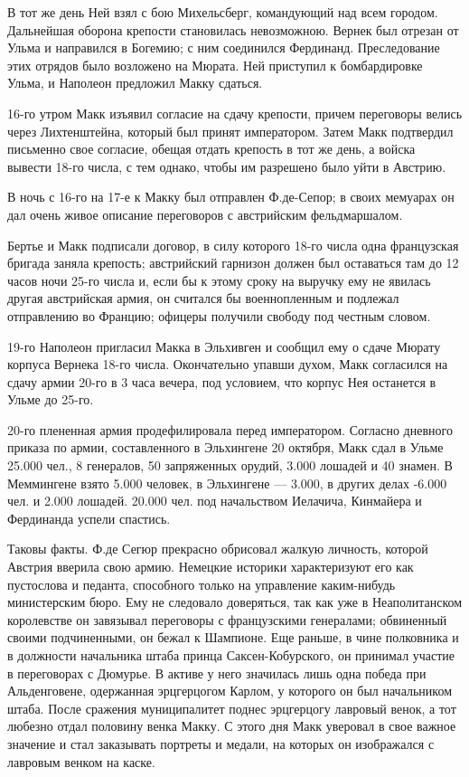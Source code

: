 \documentclass[
  oneside,
  12pt,
  titlepage]{book}
\begin{document}
В тот же день Ней взял с бою Михельсберг, командующий над всем городом. Дальнейшая оборона крепости становилась невозможною. Вернек был отрезан от Ульма и направился в Богемию; с ним соединился Фердинанд. Преследование этих отрядов было возложено на Мюрата. Ней приступил к бомбардировке Ульма, и Наполеон предложил Макку сдаться.

16-го утром Макк изъявил согласие на сдачу крепости, причем переговоры велись через Лихтенштейна, который был принят императором. Затем Макк подтвердил письменно свое согласие, обещая отдать крепость в тот же день, а войска вывести 18-го числа, с тем однако, чтобы им разрешено было уйти в Австрию.

В ночь с 16-го на 17-е к Макку был отправлен Ф.де-Сепор; в своих мемуарах он дал очень живое описание переговоров с австрийским фельдмаршалом.

Бертье и Макк подписали договор, в силу которого 18-го числа одна французская бригада заняла крепость; австрийский гарнизон должен был оставаться там до 12 часов ночи 25-го числа и, если бы к этому сроку на выручку ему не явилась другая австрийская армия, он считался бы военнопленным и подлежал отправлению во Францию; офицеры получили свободу под честным словом.

19-го Наполеон пригласил Макка в Эльхивген и сообщил ему о сдаче Мюрату корпуса Вернека 18-го числа. Окончательно упавши духом, Макк согласился на сдачу армии 20-го в 3 часа вечера, под условием, что корпус Нея останется в Ульме до 25-го.

20-го плененная армия продефилировала перед императором. Согласно дневного приказа по армии, составленного в Эльхингене 20 октября, Макк сдал в Ульме 25.000 чел., 8 генералов, 50 запряженных орудий, 3.000 лошадей и 40 знамен. В Меммингене взято 5.000 человек, в Эльхингене --- 3.000, в других делах -6.000 чел. и 2.000 лошадей. 20.000 чел. под начальством Иелачича, Кинмайера и Фердинанда успели спастись.

Таковы факты. Ф.де Сегюр прекрасно обрисовал жалкую личность, которой Австрия вверила свою армию. Немецкие историки характеризуют его как пустослова и педанта, способного только на управление каким-нибудь министерским бюро. Ему не следовало доверяться, так как уже в Неаполитанском королевстве он завязывал переговоры с французскими генералами; обвиненный своими подчиненными, он бежал к Шампионе. Еще раньше, в чине полковника и в должности начальника штаба принца Саксен-Кобурского, он принимал участие в переговорах с Дюмурье. В активе у него значилась лишь одна победа при Альденговене, одержанная эрцгерцогом Карлом, у которого он был начальником штаба. После сражения муниципалитет поднес эрцгерцогу лавровый венок, а тот любезно отдал половину венка Макку. С этого дня Макк уверовал в свое важное значение и стал заказывать портреты и медали, на которых он изображался с лавровым венком на каске.
\end{document}
